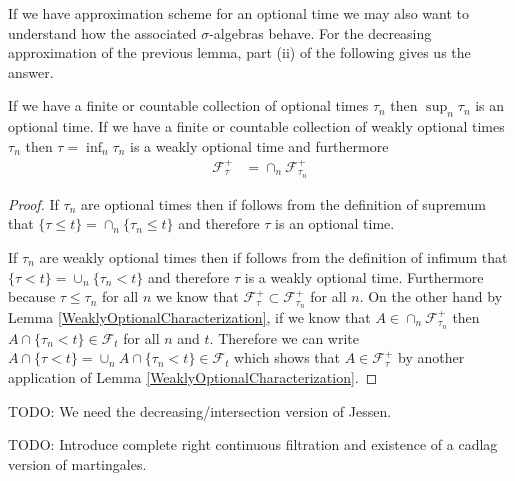 If we have approximation scheme for an optional time we may also want
to understand how the associated $\sigma$-algebras behave.  For the
decreasing approximation of the previous lemma, part (ii) of the
following gives us the answer.
\begin{lem}\label{InfSupStoppedFiltration}If we have a finite or countable collection of optional
  times $\tau_n$ then $\sup_n \tau_n$ is an optional time.  If we have
  a finite or countable collection of weakly optional times $\tau_n$
  then $\tau = \inf_n \tau_n$ is a weakly optional time and
  furthermore
\begin{align*}
\mathcal{F}^+_\tau &= \cap_n \mathcal{F}^+_{\tau_n}
\end{align*}
\end{lem}
\begin{proof}
If $\tau_n$ are optional times then if follows from the definition of
supremum that $\lbrace \tau \leq t \rbrace = \cap_n \lbrace \tau_n
\leq t \rbrace$ and therefore $\tau$ is an optional time.

If $\tau_n$ are weakly optional times then if follows from the definition of
infimum that $\lbrace \tau < t \rbrace = \cup_n \lbrace \tau_n
< t \rbrace$ and therefore $\tau$ is a weakly optional time.
Furthermore because $\tau \leq \tau_n$ for all $n$ we know that
$\mathcal{F}^+_\tau \subset \mathcal{F}^+_{\tau_n}$ for all $n$.  On
the other hand by Lemma \ref{WeaklyOptionalCharacterization}, if we know that $A \in \cap_n \mathcal{F}^+_{\tau_n}$
then $A \cap \lbrace \tau_n < t \rbrace \in \mathcal{F}_t$ for all $n$
and $t$.  Therefore we can write $A \cap \lbrace \tau < t \rbrace =  \cup_n A \cap \lbrace \tau_n
< t \rbrace \in \mathcal{F}_t$ which shows that $A \in
\mathcal{F}^+_\tau$ by another application of Lemma \ref{WeaklyOptionalCharacterization}.
\end{proof}

TODO: We need the decreasing/intersection version of Jessen.

TODO: Introduce complete right continuous filtration and existence of
a cadlag version of martingales.

